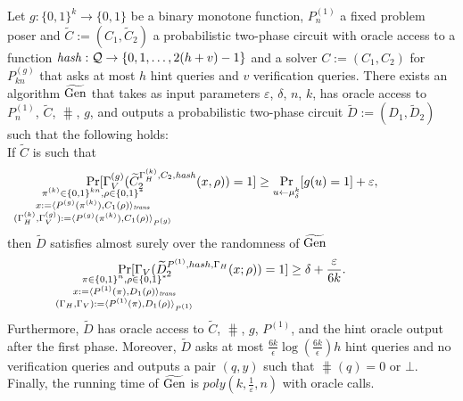 \begin{lemma}
  \label{lemma:sec_amp_for_p_hash}
  Let $g: \{0,1\}^{k} \rightarrow \{0,1\}$ be a binary monotone function, $P_n^{(1)}$ a fixed
  problem poser and $\widetilde{C} := (C_1, \widetilde{C}_2)$ a probabilistic two-phase circuit
  with oracle access to a function $\operatorname{\mathit{hash}}: \mathcal{Q} \rightarrow \{0,1,\dots, 2(h+v)-1\}$
  and a solver $C := (C_1, C_2)$ for $P_{kn}^{(g)}$ that asks at most $h$ hint queries and $v$ verification queries.
  There exists an algorithm $\widetilde{\operatorname{\text{Gen}}}$ that takes as input parameters $\varepsilon$, $\delta$, $n$, $k$,
  has oracle access to $P_n^{(1)}$,  $\widetilde{C}$, $\hash$, $g$,
  and outputs a probabilistic two-phase circuit $\widetilde{D} := (D_1, \widetilde{D}_2)$ such that the following holds: \\
  If $\widetilde{C}$ is such that
  \begin{align*}
    \underset{\mathclap{\substack{
          \pi^{(k)} \in \{0,1\}^{kn}, \rho \in \{0,1\}^{*} \\
          x:= \langle P^{(g)}(\pi^{(k)}), {C}_1(\rho) \rangle_{\mathit{trans}} \\
          (\Gamma_H^{(k)}, \Gamma_V^{(g)}) := \langle P^{(g)}(\pi^{(k)}), C_1(\rho) \rangle_{P^{(g)}}}}}
    {\Pr}[\Gamma_V^{(g)}(\widetilde{C}_2^{\Gamma_H^{(k)}, C_2, \hash}(x,\rho)) = 1]
    \geq \underset{u \leftarrow \mu_\delta^k}{\Pr}[g(u) = 1] + \varepsilon,
  \end{align*}
  then $\widetilde{D}$ satisfies almost surely over the randomness of $\widetilde{\operatorname{\text{Gen}}}$
  \begin{align*}
    \underset{
      \mathclap{
      \substack{
        \pi \in \{0,1\}^{n}, \rho \in \{0,1\}^{*} \\
        x := \langle P^{(1)}(\pi), D_1(\rho) \rangle_{\mathit{trans}} \\
        (\Gamma_H, \Gamma_V) := \langle P^{(1)}(\pi), D_1(\rho) \rangle_{P^{(1)}}}}}
    {\Pr}[\Gamma_V(\widetilde{D}_2^{P^{(1)}, hash, \Gamma_H}(x; \rho)) = 1] \geq \delta + \frac{\varepsilon}{6k}.
  \end{align*}
  Furthermore, $\widetilde{D}$ has oracle access to $\widetilde{C}$, $\hash$, $g$, $P^{(1)}$, and the hint oracle output after the first phase.
  Moreover, $\widetilde{D}$ asks at most $\frac{6k}{\epsilon}\log\left(\frac{6k}{\epsilon}\right) h$ hint queries and no verification queries
  and outputs a pair $(q, y)$ such that $\hash(q) = 0$ or $\bot$.
  Finally, the running time of $\widetilde{\operatorname{\text{Gen}}}$ is $poly(k, \frac{1}{\varepsilon}, n)$ with oracle calls.
\end{lemma}
